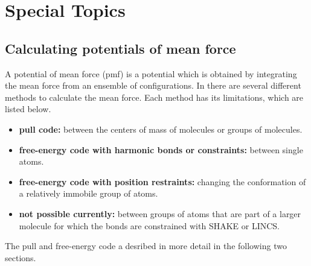 %
% 
% 
% 
% 
% 
% 
% 
% 
%

\chapter{Special Topics}
\label{ch:special}

\section{Calculating potentials of mean force}

A potential of mean force (pmf) is a potential which is obtained
by integrating the mean force from an ensemble of configurations.
In {\gromacs} there are several different methods to calculate the mean force.
Each method has its limitations, which are listed below.
\begin{itemize}
\item{\bf pull code:} between the centers of mass of molecules or groups of molecules.
\item{\bf free-energy code with harmonic bonds or constraints:} between single atoms. 
\item{\bf free-energy code with position restraints:} changing the conformation of a relatively immobile group of atoms.
\item{\bf not possible currently:} between groups of atoms that are
part of a larger molecule for which the bonds are constrained with
SHAKE or LINCS.
\end{itemize}
The pull and free-energy code a desribed in more detail
in the following two sections.

